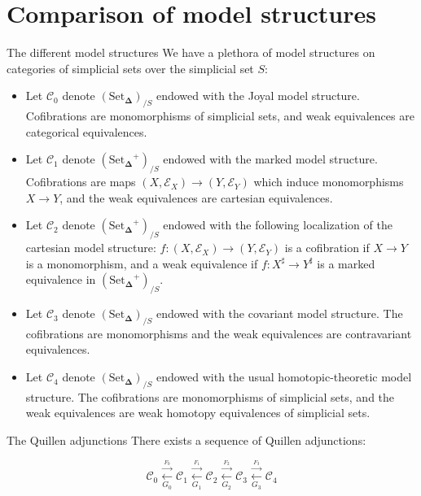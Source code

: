 \documentclass{beamer}[9pt]
\newcommand{\8}{\ensuremath{\infty}}
\newcommand{\C}{\ensuremath{\mathscr{C}}}
\newcommand{\SSet}{\ensuremath{\text{Set}_{\boldsymbol{\Delta}}}}
\newcommand{\adj}[2]{\ensuremath{\overset{\overset{#1}{ \rightarrow}}{\underset{#2}{\leftarrow}}}}
\begin{document}
\section{Comparison of model structures}

\begin{frame}{The different model structures}
  We have a plethora of model structures on categories of simplicial sets over the simplicial set $S$:

  \begin{itemize}
    \item<1->[(0)] Let $\C_0$ denote $(\SSet)_{/S}$ endowed with the Joyal model structure. Cofibrations are monomorphisms of simplicial sets, and weak equivalences are categorical equivalences.
    \item<2>[(1)]  Let $\C_1$ denote $(\SSet^+)_{/S}$ endowed with the marked model structure. Cofibrations are maps $(X, \mathcal{E}_X) \rightarrow (Y, \mathcal{E}_Y)$ which induce monomorphisms $X \rightarrow Y$, and the weak equivalences are cartesian equivalences.
  \end{itemize}
\end{frame}

\begin{frame}
  \begin{itemize}
    \item<1->[(2)]  Let $\C_2$ denote $(\SSet^+)_{/S}$ endowed with the following localization of the cartesian model structure: $f : (X, \mathcal{E}_X) \rightarrow (Y, \mathcal{E}_Y)$ is a cofibration if $X \rightarrow Y$ is a monomorphism, and a weak equivalence if $f : X^\sharp \rightarrow Y^\sharp$ is a marked equivalence in $(\SSet^+)_{/S}$.
    \item<2->[(3)]  Let $\C_3$ denote $(\SSet)_{/S}$ endowed with the covariant model structure. The cofibrations are monomorphisms and the weak equivalences are contravariant equivalences.
    \item<3>[(4)] Let $\C_4$ denote $(\SSet)_{/S}$ endowed with the usual homotopic-theoretic model structure. The cofibrations are monomorphisms of simplicial sets, and the weak equivalences are weak homotopy equivalences of simplicial sets.
  \end{itemize}
\end{frame}

\begin{frame}{The Quillen adjunctions}
  There exists a sequence of Quillen adjunctions:

  $$
    \C_0 \adj{F_0}{G_0} \C_1 \adj{F_1}{G_1} \C_2 \adj{F_2}{G_2} \C_3 \adj{F_3}{G_3} \C_4
  $$
\end{frame}
\end{document}
